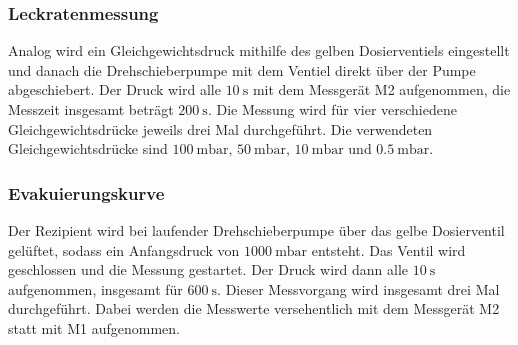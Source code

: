             \subsubsection{Leckratenmessung}
                Analog wird ein Gleichgewichtsdruck mithilfe des gelben Dosierventiels eingestellt und danach die Drehschieberpumpe mit dem Ventiel direkt über der Pumpe abgeschiebert.
                Der Druck wird alle $\SI{10}{\second}$ mit dem Messgerät M2 aufgenommen, die Messzeit insgesamt beträgt $\SI{200}{\second}$.
                Die Messung wird für vier verschiedene Gleichgewichtsdrücke jeweils drei Mal durchgeführt.
                Die verwendeten Gleichgewichtsdrücke sind $\SI{100}{\milli\bar},\, \SI{50}{\milli\bar},\, \SI{10}{\milli\bar}$ und $\SI{0.5}{\milli\bar}$.
            \subsubsection{Evakuierungskurve}
                Der Rezipient wird bei laufender Drehschieberpumpe über das gelbe Dosierventil gelüftet, sodass ein Anfangsdruck von $\SI{1000}{\milli\bar}$ entsteht.
                Das Ventil wird geschlossen und die Messung gestartet.
                Der Druck wird dann alle $\SI{10}{\second}$ aufgenommen, insgesamt für $\SI{600}{\second}$.
                Dieser Messvorgang wird insgesamt drei Mal durchgeführt.
                Dabei werden die Messwerte versehentlich mit dem Messgerät M2 statt mit M1 aufgenommen.